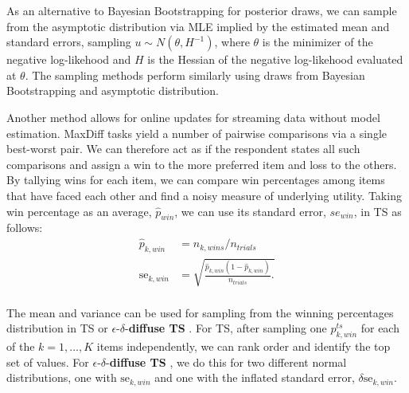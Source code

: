 \documentclass[a4paper,11pt]{article}
\newcommand{\edts}{$\epsilon$-$\delta$-\textbf{diffuse TS} }
\begin{document}
As an alternative to Bayesian Bootstrapping for posterior draws, we can sample from the asymptotic distribution via MLE implied by the estimated mean and standard errors, sampling $u \sim N(\theta,H^{-1})$, where $\theta$ is the minimizer of the negative log-likehood and $H$ is the Hessian of the negative log-likehood evaluated at $\theta$. The sampling methods perform similarly using draws from Bayesian Bootstrapping and asymptotic distribution.

Another method allows for online updates for streaming data without model estimation. MaxDiff tasks yield a number of pairwise comparisons via a single best-worst pair. We can therefore act as if the respondent states all such comparisons and assign a win to the more preferred item and loss to the others. By tallying wins for each item, we can compare win percentages among items that have faced each other and find a noisy measure of underlying utility. Taking win percentage as an average, $\hat{p}_{win}$, we can use its standard error, $se_{win}$, in TS as follows:
\begin{align}
\hat{p}_{k,win} &= n_{k,wins} / n_{trials} \\
\text{se}_{k,win} &= \sqrt{  \frac{ \hat{p}_{k,win} (1-\hat{p}_{k,win}) } {n_{trials}}.  } \\
\end{align}

The mean and variance can be used for sampling from the winning percentages distribution in TS or \edts. For TS, after sampling one $p_{k,win}^{ts}$ for each of the $k=1,\ldots,K$ items independently, we can rank order and identify the top set of values. For \edts, we do this for two different normal distributions, one with $\text{se}_{k,win}$ and one with the inflated standard error, $\delta \text{se}_{k,win}$.
\end{document}
